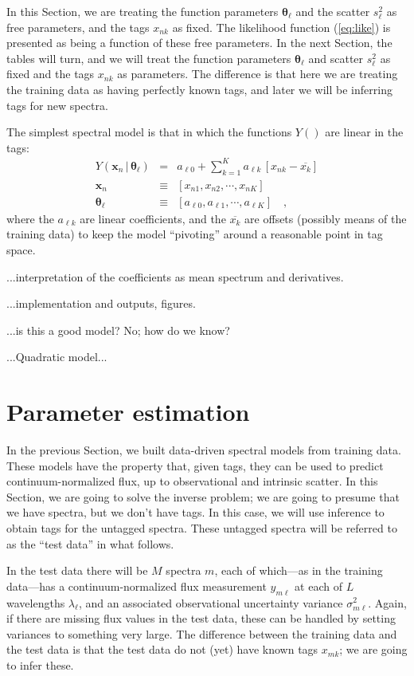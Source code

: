 \documentclass[12pt, preprint]{aastex}
\newcommand{\sectionname}{Section}
\newcommand{\set}[1]{\bm{#1}}
\newcommand{\mean}[1]{\overline{#1}}
\newcommand{\given}{\,|\,}
\begin{document}
In this \sectionname, we are treating the function parameters
$\set{\theta}_\ell$ and the scatter $s_\ell^2$ as free parameters, and the
tags $x_{nk}$ as fixed.
The likelihood function (\ref{eq:like}) is presented as being a
function of these free parameters.
In the next \sectionname, the tables will turn, and we will treat the
function parameters $\set{\theta}_\ell$ and scatter $s_\ell^2$ as fixed and
the tags $x_{nk}$ as parameters.
The difference is that here we are treating the training data as
having perfectly known tags, and later we will be inferring tags for
new spectra.

The simplest spectral model is that in which the functions $Y()$ are
linear in the tags:
\begin{eqnarray}
Y(\set{x}_n\given\set{\theta}_\ell) &=& a_{\ell 0} + \sum_{k=1}^K a_{\ell k}\,[x_{nk} - \mean{x_k}]
\label{eq:linear}\\
\set{x}_n &\equiv& [x_{n1}, x_{n2}, \cdots, x_{nK}]
\\
\set{\theta}_\ell &\equiv& [a_{\ell 0}, a_{\ell 1}, \cdots, a_{\ell K}]
\quad ,
\end{eqnarray}
where the $a_{\ell k}$ are linear coefficients, and
the $\mean{x_k}$ are offsets (possibly means of the training data) to
keep the model ``pivoting'' around a reasonable point in tag space.

...interpretation of the coefficients as mean spectrum and derivatives.

...implementation and outputs, figures.

...is this a good model?  No; how do we know?

...Quadratic model...

\section{Parameter estimation}

In the previous \sectionname, we built data-driven spectral models
from training data.
These models have the property that, given tags, they can be used to
predict continuum-normalized flux, up to observational and intrinsic
scatter.
In this \sectionname, we are going to solve the inverse problem; we
are going to presume that we have spectra, but we don't have tags.
In this case, we will use inference to obtain tags for the untagged
spectra.
These untagged spectra will be referred to as the ``test data'' in
what follows.

In the test data there will be $M$ spectra $m$, each of which---as in
the training data---has a continuum-normalized flux measurement
$y_{m\ell}$ at each of $L$ wavelengths $\lambda_\ell$, and an
associated observational uncertainty variance $\sigma_{m\ell}^2$.
Again, if there are missing flux values in the test data, these can be
handled by setting variances to something very large.
The difference between the training data and the test data is that the
test data do not (yet) have known tags $x_{mk}$; we are going to infer
these.
\end{document}
